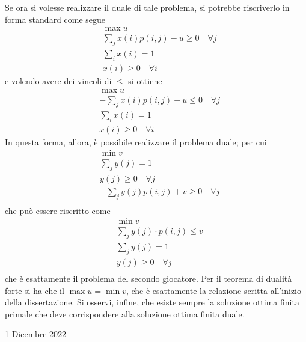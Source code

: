 \documentclass[a4paper]{extarticle}
\begin{document}
\vspace{2em}
\noindent
Se ora si volesse realizzare il duale di tale problema, si potrebbe riscriverlo in forma standard come segue
\begin{align*}
    &\max u\\
    &\sum_j x(i) p(i,j)-u\geq 0 \hspace{1em} \forall j\\
    &\sum_i x(i)=1\\
    &x(i) \geq 0 \hspace{1em} \forall i
\end{align*}
e volendo avere dei vincoli di $\leq$ si ottiene
\begin{align*}
    &\max u\\
    &-\sum_j x(i) p(i,j)+u\leq 0 \hspace{1em} \forall j\\
    &\sum_i x(i)=1\\
    &x(i) \geq 0 \hspace{1em} \forall i
\end{align*}
In questa forma, allora, è possibile realizzare il problema duale; per cui
\begin{align*}
    &\min v\\
    &\sum_j y(j)=1\\
    &y(j) \geq 0 \hspace{1em} \forall j\\
    &-\sum_j y(j) p(i,j)+v\geq 0 \hspace{1em} \forall j\\
\end{align*}
che può essere riscritto come
\begin{align*}
    &\min v\\
    &\sum_j y(j) \cdot p(i,j) \leq v\\
    &\sum_j y(j) = 1\\
    &y(j) \geq 0 \hspace{1em} \forall j\\
\end{align*}
che è esattamente il problema del secondo giocatore. Per il teorema di dualità forte si ha che il $\max u = \min v$, che è esattamente la relazione scritta all'inizio della dissertazione. Si osservi, infine, che esiste sempre la soluzione ottima finita primale che deve corrispondere alla soluzione ottima finita duale.

\newpage
\begin{center}
    1 Dicembre 2022
\end{center}
\end{document}
